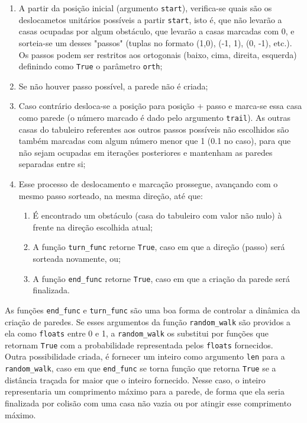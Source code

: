 \documentclass[12pt]{article}
\begin{document}
\begin{enumerate}
	\item A partir da posição inicial (argumento \verb|start|), verifica-se quais são os deslocametos unitários possíveis a partir \verb|start|, isto é, que não levarão a casas ocupadas por algum obstáculo, que levarão a casas marcadas com 0, e sorteia-se um desses "passos" (tuplas no formato (1,0), (-1, 1), (0, -1), etc.). Os passos podem ser restritos aos ortogonais (baixo, cima, direita, esquerda) definindo como \verb|True| o parâmetro \verb|orth|;
	\item Se não houver passo possível, a parede não é criada;
	\item Caso contrário desloca-se a posição para posição + passo e marca-se essa casa como parede (o número marcado é dado pelo argumento \verb|trail|). As outras casas do tabuleiro referentes aos outros passos possíveis não escolhidos são também marcadas com algum número menor que 1 (0.1 no caso), para que não sejam ocupadas em iterações posteriores e mantenham as paredes separadas entre si;
	\item Esse processo de deslocamento e marcação prossegue, avançando com o mesmo passo sorteado, na mesma direção, até que:
		\begin{enumerate}
			\item É encontrado um obstáculo (casa do tabuleiro com valor não nulo) à frente na direção escolhida atual;
			\item A função \verb|turn_func| retorne \verb|True|, caso em que a direção (passo) será sorteada novamente, ou;
			\item A função \verb|end_func| retorne \verb|True|, caso em que a criação da parede será finalizada.
		\end{enumerate}
\end{enumerate}

As funções \verb|end_func| e \verb|turn_func| são uma boa forma de controlar a dinâmica da criação de paredes. Se esses argumentos da função \verb|random_walk| são providos a ela como \verb|floats| entre 0 e 1, a \verb|random_walk| os substitui por funções que retornam \verb|True| com a probabilidade representada pelos \verb|floats| fornecidos.\\

Outra possibilidade criada, é fornecer um inteiro como argumento \verb|len| para a \verb|random_walk|, caso em que \verb|end_func| se torna função que retorna \verb|True| se a distância traçada for maior que o inteiro fornecido. Nesse caso, o inteiro representaria um comprimento máximo para a parede, de forma que ela seria finalizada por colisão com uma casa não vazia ou por atingir esse comprimento máximo.
\end{document}
